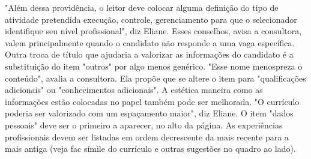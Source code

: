 "Além dessa providência, o leitor deve colocar alguma definição do tipo de atividade pretendida execução, controle, gerenciamento para que o selecionador identifique seu nível profissional", diz Eliane.
Esses conselhos, avisa a consultora, valem principalmente quando o candidato não responde a uma vaga específica.
Outra troca de título que ajudaria a valorizar as informações do candidato é a substituição do item "outros" por algo menos genérico. "Esse nome menospreza o conteúdo", avalia a consultora.
Ela propõe que se altere o item para "qualificações adicionais" ou "conhecimentos adicionais".
A estética maneira como as informações estão colocadas no papel também pode ser melhorada. "O currículo poderia ser valorizado com um espaçamento maior", diz Eliane.
O item "dados pessoais" deve ser o primeiro a aparecer, no alto da página. As experiências profissionais devem ser listadas em ordem decrescente da mais recente para a mais antiga (veja fac símile do currículo e outras sugestões no quadro ao lado).

